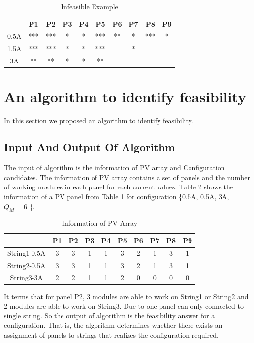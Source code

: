 \documentclass[conference]{IEEEtran}
\begin{document}
\begin{table}[htbp]
    \caption{Infeasible Example}
    \begin{center}
    \begin{tabular}{c|c|c|c|c|c|c|c|c|c}
    \hline\hline
             & P1 & P2  & P3  & P4 & P5 & P6  & P7  & P8  & P9  \\ \hline
         0.5A & ***& *** & *   & *  & ***& **  & *   & *** & * \\ \hline
         1.5A & ***& *** & *   & *  & ***&     & *   &     &   \\ \hline
         3A   & ** & **  & *   & *  & ** &     &     &     &   \\\hline \hline
    \end{tabular}
    \label{not_feasible}
    \end{center}
\end{table}
\section{An algorithm to identify feasibility}\label{Sec5}
In this section we proposed an algorithm to identify feasibility.
\subsection{Input And Output Of Algorithm}\label{Sec5_1}
The input of algorithm is the information of PV array and Configuration candidates. The information of PV array contains a set of panels and the number of working modules in each panel for each current values. Table \ref{Info_Array} shows the information of a PV panel from Table \ref{not_feasible} for configuration \{0.5A, 0.5A, 3A, $Q_M = 6$ \}.
\begin{table}[htbp]
    \caption{Information of PV Array}
    \begin{center}
    \begin{tabular}{c|c|c|c|c|c|c|c|c|c}
    \hline\hline
             & P1 & P2  & P3  & P4 & P5 & P6  & P7  & P8  & P9  \\ \hline
         String1-0.5A & 3& 3 & 1   & 1  & 3& 2  & 1   & 3 & 1 \\ \hline
         String2-0.5A & 3& 3 & 1   & 1  & 3& 2  & 1   & 3 & 1  \\ \hline
         String3-3A   & 2 & 2  & 1   & 1  & 2 & 0  &0   &0  &0  \\\hline \hline
    \end{tabular}
    \label{Info_Array}
    \end{center}
\end{table}
It terms that for panel P2, 3 modules are able to work on String1 or String2 and 2 modules are able to work on String3. Due to one panel can only connected to single string. So the output of algorithm is the feasibility answer for a configuration. That is, the algorithm determines whether there exists an assignment of panels to strings that realizes the configuration required.
\end{document}
